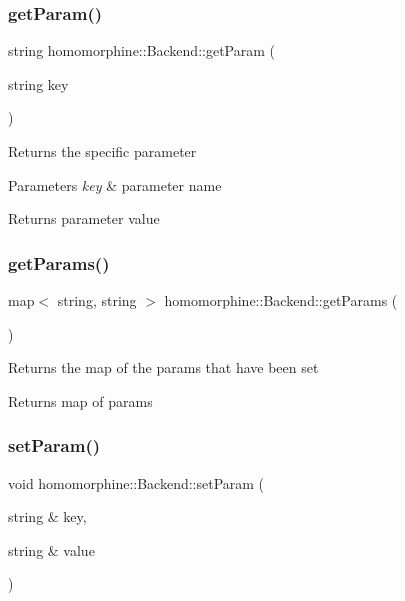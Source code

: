 \subsubsection{\texorpdfstring{get\+Param()}{getParam()}}
{\footnotesize\ttfamily string homomorphine\+::\+Backend\+::get\+Param (\begin{DoxyParamCaption}\item[{string}]{key }\end{DoxyParamCaption})}

Returns the specific parameter


\begin{DoxyParams}{Parameters}
{\em key} & parameter name \\
\hline
\end{DoxyParams}
\begin{DoxyReturn}{Returns}
parameter value 
\end{DoxyReturn}
\mbox{\label{classhomomorphine_1_1_backend_a107e05b3bd55271356a57fbc0c1df091}} 
\subsubsection{\texorpdfstring{get\+Params()}{getParams()}}
{\footnotesize\ttfamily map$<$ string, string $>$ homomorphine\+::\+Backend\+::get\+Params (\begin{DoxyParamCaption}{ }\end{DoxyParamCaption})}

Returns the map of the params that have been set

\begin{DoxyReturn}{Returns}
map of params 
\end{DoxyReturn}
\mbox{\label{classhomomorphine_1_1_backend_aacb924f4de6d50347d550da85aec15a2}} 
\subsubsection{\texorpdfstring{set\+Param()}{setParam()}}
{\footnotesize\ttfamily void homomorphine\+::\+Backend\+::set\+Param (\begin{DoxyParamCaption}\item[{string \&}]{key,  }\item[{string \&}]{value }\end{DoxyParamCaption})}

